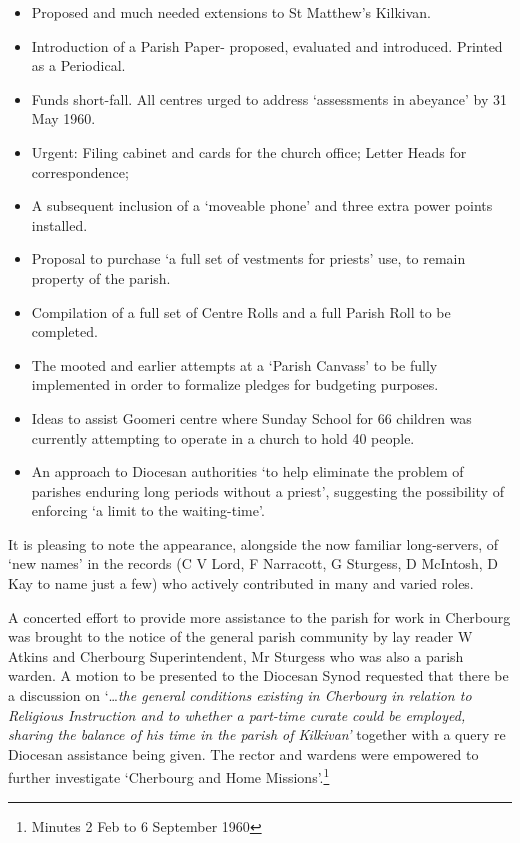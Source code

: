 \begin{itemize}
\item
  Proposed and much needed extensions to St Matthew's Kilkivan.
\item
  Introduction of a Parish Paper- proposed, evaluated and introduced.
  Printed as a Periodical.
\item
  Funds short-fall. All centres urged to address `assessments in
  abeyance' by 31 May 1960.
\item
  Urgent: Filing cabinet and cards for the church office; Letter Heads
  for correspondence;
\item
  A subsequent inclusion of a `moveable phone' and three extra power
  points installed.
\item
  Proposal to purchase `a full set of vestments for priests' use, to
  remain property of the parish.
\item
  Compilation of a full set of Centre Rolls and a full Parish Roll to be
  completed.
\item
  The mooted and earlier attempts at a `Parish Canvass' to be fully
  implemented in order to formalize pledges for budgeting purposes.
\item
  Ideas to assist Goomeri centre where Sunday School for 66 children was
  currently attempting to operate in a church to hold 40 people.
\item
  An approach to Diocesan authorities `to help eliminate the problem of
  parishes enduring long periods without a priest', suggesting the
  possibility of enforcing `a limit to the waiting-time'.
\end{itemize}

It is pleasing to note the appearance, alongside the now familiar
long-servers, of `new names' in the records (C V Lord, F Narracott, G
Sturgess, D McIntosh, D Kay to name just a few) who actively contributed
in many and varied roles.

A concerted effort to provide more assistance to the parish for work in
Cherbourg was brought to the notice of the general parish community by
lay reader W Atkins and Cherbourg Superintendent, Mr Sturgess who was
also a parish warden. A motion to be presented to the Diocesan Synod
requested that there be a discussion on `\ldots{}\emph{the general
conditions existing in Cherbourg in relation to Religious Instruction
and to whether a part-time curate could be employed, sharing the balance
of his time in the parish of Kilkivan'} together with a query re
Diocesan assistance being given. The rector and wardens were empowered
to further investigate `Cherbourg and Home Missions'.\footnote{Minutes 2
  Feb to 6 September 1960}

